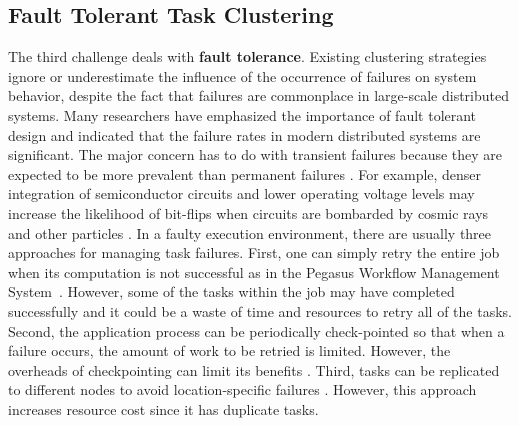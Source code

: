 
\subsection{Fault Tolerant Task Clustering}

The third challenge deals with \textbf{fault tolerance}. Existing clustering strategies ignore or underestimate the influence of the occurrence of failures on system behavior, despite the fact that failures are commonplace in large-scale distributed systems. Many researchers \cite{Zhang2004, Tang1990, Schroeder2006, Sahoo2004} have emphasized the importance of fault tolerant design and indicated that the failure rates in modern distributed systems are significant. The major concern has to do with transient failures because they are expected to be more prevalent than permanent failures \cite{Zhang2004}. For example, denser integration of semiconductor circuits and lower operating voltage levels may increase the likelihood of bit-flips when circuits are bombarded by cosmic rays and other particles \cite{Zhang2004}. In a faulty execution environment, there are usually three approaches for managing task failures. First, one can simply retry the entire job when its computation is not successful as in the Pegasus Workflow Management System~\cite{Deelman2004}. However, some of the tasks within the job may have completed successfully and it could be a waste of time and resources to retry all of the tasks. Second, the application process can be periodically check-pointed so that when a failure occurs, the amount of work to be retried is limited. However, the overheads of checkpointing can limit its benefits \cite{Zhang2004}. Third, tasks can be replicated to different nodes to avoid location-specific failures \cite{Zhang2009}. However, this approach increases resource cost since it has duplicate tasks. 

